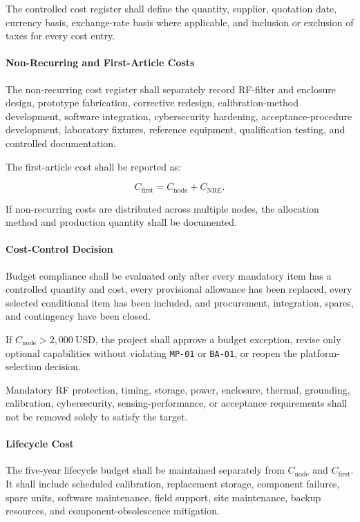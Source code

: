 \documentclass[11pt,a4paper]{article}
\begin{document}
	The controlled cost register shall define the quantity, supplier, quotation
	date, currency basis, exchange-rate basis where applicable, and inclusion or
	exclusion of taxes for every cost entry.
	
	\paragraph*{Non-Recurring and First-Article Costs}
	
	The non-recurring cost register shall separately record RF-filter and
	enclosure design, prototype fabrication, corrective redesign,
	calibration-method development, software integration, cybersecurity
	hardening, acceptance-procedure development, laboratory fixtures, reference
	equipment, qualification testing, and controlled documentation.
	
	The first-article cost shall be reported as:
	
	\[
	C_{\mathrm{first}}
	=
	C_{\mathrm{node}}
	+
	C_{\mathrm{NRE}}.
	\]
	
	If non-recurring costs are distributed across multiple nodes, the allocation
	method and production quantity shall be documented.
	
	\paragraph*{Cost-Control Decision}
	
	Budget compliance shall be evaluated only after every mandatory item has a
	controlled quantity and cost, every provisional allowance has been replaced,
	every selected conditional item has been included, and procurement,
	integration, spares, and contingency have been closed.
	
	If \(C_{\mathrm{node}}>2{,}000~\text{USD}\), the project shall approve a budget
	exception, revise only optional capabilities without violating
	\texttt{MP-01} or \texttt{BA-01}, or reopen the platform-selection decision.
	
	Mandatory RF protection, timing, storage, power, enclosure, thermal,
	grounding, calibration, cybersecurity, sensing-performance, or acceptance
	requirements shall not be removed solely to satisfy the target.
	
	\paragraph*{Lifecycle Cost}
	
	The five-year lifecycle budget shall be maintained separately from
	\(C_{\mathrm{node}}\) and \(C_{\mathrm{first}}\). It shall include scheduled
	calibration, replacement storage, component failures, spare units, software
	maintenance, field support, site maintenance, backup resources, and
	component-obsolescence mitigation.
	
\end{document}
